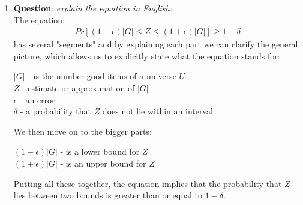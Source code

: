 \documentclass[11pt,a4paper,english]{article}
\begin{document}
\begin{enumerate}
\begin{enumerate}
          \item \textbf{Question}: \textit{explain the equation in English:} \\
            The equation:
            \begin{align*}
              Pr[(1 - \epsilon)|G| \leq Z \leq (1 + \epsilon)|G|] \geq 1 - \delta
            \end{align*}
            has several "segments" and by explaining each part we can clarify the general picture, which allows us to explicitly state what the equation stands for:

            $|G|$ - is the number good items of a universe $U$ \\
            $Z$ - estimate or approximation of $|G|$ \\
            $\epsilon$ - an error \\
            $\delta$ - a probability that $Z$ does not lie within an interval

            We then move on to the bigger parts:

            $(1 - \epsilon)|G|$ - is a lower bound for $Z$ \\
            $(1 + \epsilon)|G|$ - is an upper bound for $Z$

            Putting all these together, the equation implies that the probability that $Z$ lies between two bounds is greater than or equal to $1 - \delta$.


\end{enumerate}
\end{enumerate}
\end{document}
